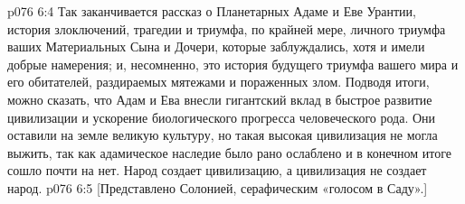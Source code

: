 \vs p076 6:4 \pc Так заканчивается рассказ о Планетарных Адаме и Еве Урантии, история злоключений, трагедии и триумфа, по крайней мере, личного триумфа ваших Материальных Сына и Дочери, которые заблуждались, хотя и имели добрые намерения; и, несомненно, это история будущего триумфа вашего мира и его обитателей, раздираемых мятежами и пораженных злом. Подводя итоги, можно сказать, что Адам и Ева внесли гигантский вклад в быстрое развитие цивилизации и ускорение биологического прогресса человеческого рода. Они оставили на земле великую культуру, но такая высокая цивилизация не могла выжить, так как адамическое наследие было рано ослаблено и в конечном итоге сошло почти на нет. Народ создает цивилизацию, а цивилизация не создает народ.
\vsetoff
\vs p076 6:5 [Представлено Солонией, серафическим «голосом в Саду».]
